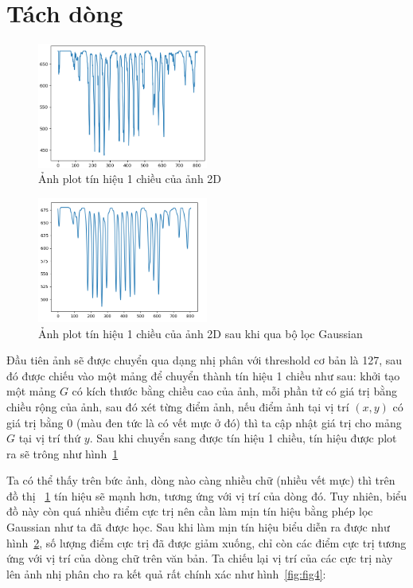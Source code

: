 \documentclass[a4paper]{article}
\begin{document}
\pagebreak

\section{Tách dòng}
\label{sec:2}

\begin{figure}
    \centering
    \includegraphics[width=0.5\textwidth]{projection1d.png}
    \caption{Ảnh plot tín hiệu 1 chiều của ảnh 2D}
    \label{fig:fig2}
\end{figure}

\begin{figure}
    \centering
    \includegraphics[width=0.5\textwidth]{gauss1d.png}
    \caption{Ảnh plot tín hiệu 1 chiều của ảnh 2D sau khi qua bộ lọc Gaussian}
    \label{fig:fig3}
\end{figure}

Đầu tiên ảnh sẽ được chuyển qua dạng nhị phân với threshold cơ bản là 127, sau đó được chiếu vào một mảng để chuyển thành tín hiệu 1 chiều như sau: khởi tạo một mảng $G$ có kích thước bằng chiều cao của ảnh, mỗi phần tử có giá trị bằng chiều rộng của ảnh, sau đó xét từng điểm ảnh, nếu điểm ảnh tại vị trí $(x, y)$ có giá trị bằng 0 (màu đen tức là có vết mực ở đó) thì ta cập nhật giá trị cho mảng $G$ tại vị trí thứ $y$. Sau khi chuyển sang được tín hiệu 1 chiều, tín hiệu được plot ra sẽ trông như hình~\ref{fig:fig2}\par

Ta có thể thấy trên bức ảnh, dòng nào càng nhiều chữ (nhiều vết mực) thì trên đồ thị ~\ref{fig:fig2} tín hiệu sẽ mạnh hơn, tương ứng với vị trí của dòng đó. Tuy nhiên, biểu đồ này còn quá nhiều điểm cực trị nên cần làm mịn tín hiệu bằng phép lọc Gaussian như ta đã được học. Sau khi làm mịn tín hiệu biểu diễn ra được như hình~\ref{fig:fig3}, số lượng điểm cực trị đã được giảm xuống, chỉ còn các điểm cực trị tương ứng với vị trí của dòng chữ trên văn bản. Ta chiếu lại vị trí của các cực trị này lên ảnh nhị phân cho ra kết quả rất chính xác như hình~\ref{fig:fig4}:
\end{document}
